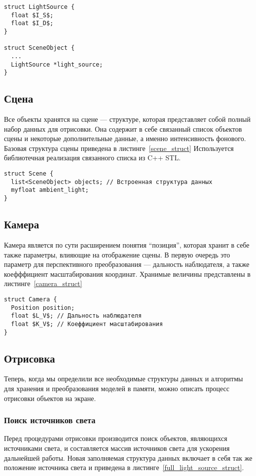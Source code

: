 \documentclass[a4paper,12pt]{report}
\numberwithin{equation}{section}
\begin{document}
\begin{lstlisting}[float=h,caption={Структура ``Источник света''},label=light_source_struct]
struct LightSource {
  float $I_S$;
  float $I_D$;
}

struct SceneObject {
  ...
  LightSource *light_source;
}
\end{lstlisting}

\subsection{Сцена}
Все объекты хранятся на сцене --- структуре, которая представляет собой полный набор данных для отрисовки. Она содержит в себе связанный список объектов сцены и некоторые дополнительные данные, а именно интенсивность фонового. Базовая структура сцены приведена в листинге~\ref{scene_struct} Используется библиотечная реализация связанного списка из C++ STL.

\begin{lstlisting}[float=h,caption={Структура ``Сцена''},label=scene_struct]
struct Scene {
  list<SceneObject> objects; // Встроенная структура данных
  myfloat ambient_light;
}
\end{lstlisting}

\subsection{Камера}
Камера является по сути расширением понятия ``позиция'', которая хранит в себе также параметры, влияющие на отображение сцены. В первую очередь это параметр для перспективного преобразования --- дальность наблюдателя, а также коефффициент масштабирования координат. Хранимые величины представлены в листинге~\ref{camera_struct}

\begin{lstlisting}[float=h,caption={Структура ``Камера''},label=camera_struct]
struct Camera {
  Position position;
  float $L_V$; // Дальность наблюдателя
  float $K_V$; // Коеффициент масштабирования
}
\end{lstlisting}

\subsection{Отрисовка}
Теперь, когда мы определили все необходимые структуры данных и алгоритмы для хранения и преобразования моделей в памяти, можно описать процесс отрисовки объектов на экране.

\subsubsection{Поиск источников света}
Перед процедурами отрисовки производится поиск объектов, являющихся источниками света, и составляется массив источников света для ускорения дальнейшей работы. Новая заполняемая структура данных включает в себя так же положение источника света и приведена в листинге~\ref{full_light_source_struct}.
\end{document}
